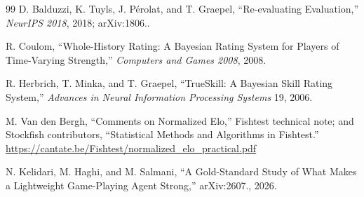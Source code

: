 \begin{thebibliography}{99}
D. Balduzzi, K. Tuyls, J. P\'erolat, and T. Graepel, ``Re-evaluating
Evaluation,'' \emph{NeurIPS 2018}, 2018; arXiv:1806..

R. Coulom, ``Whole-History Rating: A Bayesian Rating System for Players of
Time-Varying Strength,'' \emph{Computers and Games 2008}, 2008.

R. Herbrich, T. Minka, and T. Graepel, ``TrueSkill\texttrademark: A Bayesian
Skill Rating System,'' \emph{Advances in Neural Information Processing Systems}
19, 2006.

M. Van den Bergh, ``Comments on Normalized Elo,'' Fishtest technical note; and
Stockfish contributors, ``Statistical Methods and Algorithms in Fishtest.''\\
\url{https://cantate.be/Fishtest/normalized_elo_practical.pdf}

N. Kelidari, M. Haghi, and M. Salmani, ``A Gold-Standard Study of What Makes a
Lightweight Game-Playing Agent Strong,'' arXiv:2607., 2026.
\end{thebibliography}
